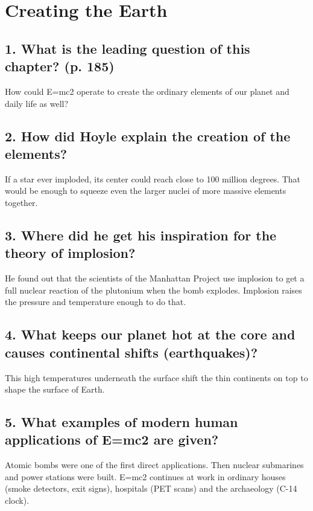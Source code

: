 %
\newpage
\section{Creating the Earth}

\subsection*{1. What is the leading question of this chapter? (p. 185)}
How could E=mc2 operate to create the ordinary elements of our planet and daily life as well?

\subsection*{2. How did Hoyle explain the creation of the elements?}
If a star ever imploded, its center could reach close to 100 million degrees. That would be enough to squeeze even the larger nuclei of more massive elements together.

\subsection*{3. Where did he get his inspiration for the theory of implosion?}
He found out that the scientists of the Manhattan Project use implosion to get a full nuclear reaction of the plutonium when the bomb explodes. Implosion raises the pressure and temperature enough to do that.

\subsection*{4. What keeps our planet hot at the core and causes continental shifts (earthquakes)?}

This high temperatures underneath the surface shift the thin continents on top to shape the surface of Earth.

\subsection*{5. What examples of modern human applications of E=mc2 are given?}
Atomic bombs were one of the first direct applications. Then nuclear submarines and power stations were built. E=mc2 continues at work in ordinary houses (smoke detectors, exit signs), hospitals (PET scans) and the archaeology (C-14 clock).